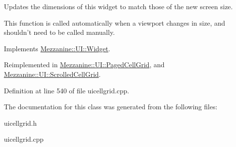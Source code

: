 Updates the dimensions of this widget to match those of the new screen size. 

This function is called automatically when a viewport changes in size, and shouldn't need to be called manually. 

Implements \hyperlink{classMezzanine_1_1UI_1_1Widget_af23f919f2912ac10230953a848c9889c}{Mezzanine::UI::Widget}.



Reimplemented in \hyperlink{classMezzanine_1_1UI_1_1PagedCellGrid_a1ff79a778710a517abb5c55a13b6a273}{Mezzanine::UI::PagedCellGrid}, and \hyperlink{classMezzanine_1_1UI_1_1ScrolledCellGrid_abb580fbe187054004c6f3f0eadec8b7e}{Mezzanine::UI::ScrolledCellGrid}.



Definition at line 540 of file uicellgrid.cpp.



The documentation for this class was generated from the following files:\begin{DoxyCompactItemize}
\item 
uicellgrid.h\item 
uicellgrid.cpp\end{DoxyCompactItemize}
